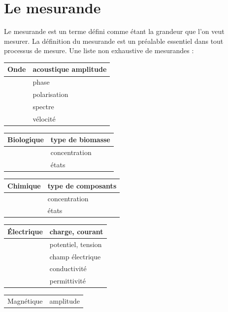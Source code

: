 \documentclass[main.tex]{subfiles}
\begin{document}
\section{Le mesurande}
Le mesurande est un terme défini comme étant la grandeur que l'on veut mesurer. La définition du mesurande est un préalable essentiel dans tout processus de mesure. Une liste non exhaustive de mesurandes :

\begin {center}
\begin{tabular}{|p{3cm}|p{7cm}|}
    \hline
    Onde & acoustique	amplitude \\
    \hline
         & phase               \\
    \hline
         & polarisation        \\
    \hline
         & spectre             \\
    \hline
         & vélocité            \\
    \hline
\end{tabular}
\begin{tabular}{|p{3cm}|p{7cm}|}
    Biologique & type de biomasse \\
    \hline
               & concentration    \\
    \hline
               & états            \\
    \hline
\end{tabular}
\begin{tabular}{|p{3cm}|p{7cm}|}
    Chimique & type de composants \\
    \hline
             & concentration      \\
    \hline
             & états              \\
    \hline
\end{tabular}
\begin{tabular}{|p{3cm}|p{7cm}|}
    Électrique & charge, courant    \\
    \hline
               & potentiel, tension \\
    \hline
               & champ électrique   \\
    \hline
               & conductivité       \\
    \hline
               & permittivité       \\
    \hline
\end{tabular}
\begin{tabular}{|p{3cm}|p{7cm}|}
    Magnétique & amplitude    \\

\end{tabular}
\end{center}
\end{document}
